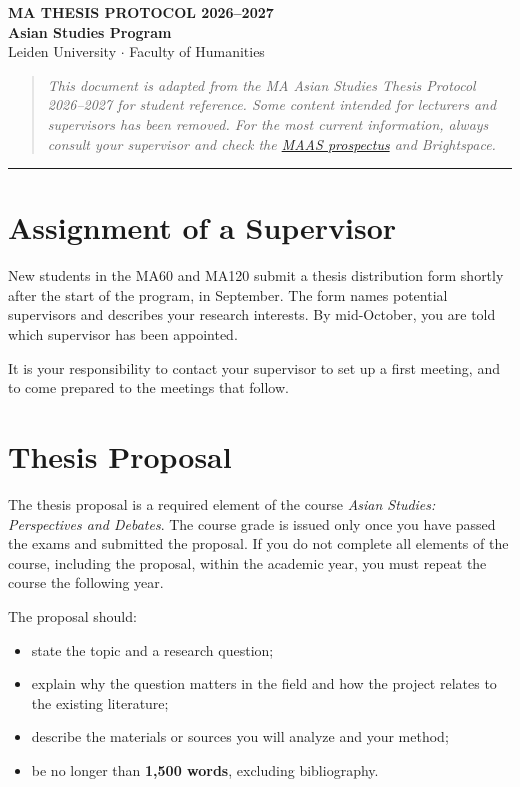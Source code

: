 \documentclass[11pt,a4paper]{article}
\begin{document}
\begin{center}
{\Large\bfseries MA THESIS PROTOCOL 2026--2027}\\[0.3em]
{\Large\bfseries Asian Studies Program}\\[0.3em]
{\normalsize Leiden University $\cdot$ Faculty of Humanities}\\[1.5em]
\end{center}

\begin{quote}
\small\textit{This document is adapted from the MA Asian Studies Thesis Protocol 2026--2027 for student reference. Some content intended for lecturers and supervisors has been removed. For the most current information, always consult your supervisor and check the \href{https://studiegids.universiteitleiden.nl/modules/5174TH01Y?tab=info&year=2261}{MAAS prospectus} and Brightspace.}
\end{quote}

\bigskip
\hrule
\bigskip

\section{Assignment of a Supervisor}

New students in the MA60 and MA120 submit a thesis distribution form shortly after the start of the program, in September. The form names potential supervisors and describes your research interests. By mid-October, you are told which supervisor has been appointed.

It is your responsibility to contact your supervisor to set up a first meeting, and to come prepared to the meetings that follow.

\section{Thesis Proposal}

The thesis proposal is a required element of the course \textit{Asian Studies: Perspectives and Debates}. The course grade is issued only once you have passed the exams and submitted the proposal. If you do not complete all elements of the course, including the proposal, within the academic year, you must repeat the course the following year.

The proposal should:

\begin{itemize}
    \item state the topic and a research question;
    \item explain why the question matters in the field and how the project relates to the existing literature;
    \item describe the materials or sources you will analyze and your method;
    \item be no longer than \textbf{1,500 words}, excluding bibliography.
\end{itemize}
\end{document}

